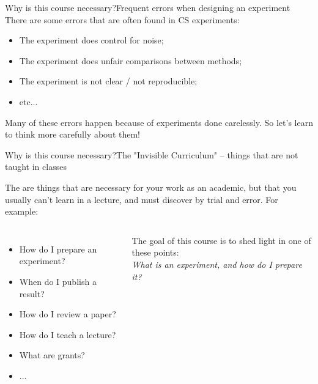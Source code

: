 \documentclass[aspectratio=169]{beamer}
\begin{document}
\begin{CJK}{UTF8}{ipxm}
\begin{frame}{Why is this course necessary?}{Frequent errors when designing an experiment}
  There are some errors that are often found in CS experiments:
  \bigskip

  \begin{itemize}
    \item The experiment does control for noise;\\
    \item The experiment does unfair comparisons between methods;\\
    \item The experiment is not clear / not reproducible;\\
    \item etc...
  \end{itemize}\bigskip

  Many of these errors happen because of experiments done
  carelessly. So let's learn to think more carefully about them!


\end{frame}

\begin{frame}{Why is this course necessary?}{The "Invisible
    Curriculum" -- things that are not taught in classes}

  The  are things that are necessary
  for your work as an academic, but that you usually can't learn in a
  lecture, and must discover by \alert{trial and error}. For
  example:\bigskip

  \begin{columns}
    \begin{itemize}
      \item How do I prepare an experiment?
      \item When do I publish a result?
      \item How do I review a paper?
      \item How do I teach a lecture?
      \item What are grants?
      \item ...
    \end{itemize}\bigskip

    The goal of this course is to shed light in one of these points:\\
    \emph{What is an experiment, and how do I prepare it?}


\end{columns}
\end{frame}
\end{CJK}
\end{document}
